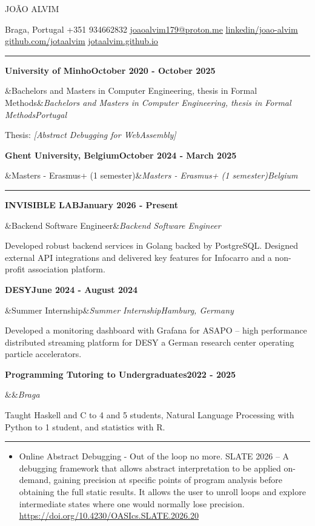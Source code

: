 \documentclass[10pt,a4paper]{article}
\newlength{\cvlabelwidth}\setlength{\cvlabelwidth}{3cm}
\newcommand{\cvlabel}[1]{%
  \raisebox{0pt}[\height][0pt]{\parbox[t]{\cvlabelwidth}{\raggedright\textbf{#1}}}\hfill}
\newcommand{\cvsection}[2]{%
  \par\noindent\textcolor{rulegray}{\rule{\linewidth}{0.4pt}}\par\vspace{5pt}
  \begin{list}{}{\setlength{\leftmargin}{\cvlabelwidth}\setlength{\labelwidth}{\cvlabelwidth}%
      \setlength{\labelsep}{0pt}\setlength{\topsep}{0pt}\setlength{\itemsep}{0pt}%
      \setlength{\parsep}{0pt}}
    \item[{\cvlabel{#1}}]#2
  \end{list}
  \vspace{8pt}
}
\newcommand{\entry}[4]{%
  \textbf{#1}\hfill\textbf{#2}\par
  \ifx&#3&\else\textit{#3}\hfill\textit{#4}\par\fi
}
\newcommand{\gap}{\vspace{5pt}}
\begin{document}
{\raggedleft\fontsize{24}{28}\selectfont JOÃO ALVIM\par}
\vspace{4pt}
{\small\noindent
Braga, Portugal \textbar{} +351 934662832 \textbar{}
\href{mailto:joaoalvim179@proton.me}{\underline{joaoalvim179@proton.me}} \textbar{}
\href{https://www.linkedin.com/in/jo\%C3\%A3o-alvim-050778223}{\underline{linkedin/joao-alvim}} \textbar{}
\href{https://github.com/jotaalvim}{\underline{github.com/jotaalvim}} \textbar{}
\href{https://jotaalvim.github.io}{\underline{jotaalvim.github.io}}\par}
\vspace{6pt}

\cvsection{EDUCATION}{%
  \entry{University of Minho}{October 2020 - October 2025}{Bachelors and Masters in Computer Engineering, thesis in Formal Methods}{Portugal}\gap
  Thesis: \textit{[Abstract Debugging for WebAssembly]} \par\gap
  \entry{Ghent University, Belgium}{October 2024 - March 2025}{Masters - Erasmus+ (1 semester)}{Belgium}\gap
}

\cvsection{WORK\\EXPERIENCE}{%
  \entry{INVISIBLE LAB}{January 2026 - Present}{Backend Software Engineer}{}
  Developed robust backend services in Golang backed by PostgreSQL. Designed external API
  integrations and delivered key features for Infocarro and a non-profit association platform.\par\gap

  \entry{DESY}{June 2024 - August 2024}{Summer Internship}{Hamburg, Germany}
  Developed a monitoring dashboard with Grafana for ASAPO -- high performance distributed streaming platform for DESY a German research center operating particle accelerators.
  \par\gap

  \entry{Programming Tutoring to Undergraduates}{2022 - 2025}{}{Braga}
  Taught Haskell and C to 4 and 5 students, Natural Language Processing with Python to 1 student,
  and statistics with R.\par\gap

}

\cvsection{PUBLICATIONS}{%
  \begin{itemize}[topsep=0pt]
    \item Online Abstract Debugging - Out of the loop no more. SLATE 2026 -- A debugging framework that allows abstract
      interpretation to be applied on-demand, gaining precision at specific points of program
      analysis before obtaining the full static results. It allows the user to unroll loops and
      explore intermediate states where one would normally lose precision. \quad
      \href{https://doi.org/10.4230/OASIcs.SLATE.2026.20}{\underline{https://doi.org/10.4230/OASIcs.SLATE.2026.20}}
  \end{itemize}
}
\end{document}
